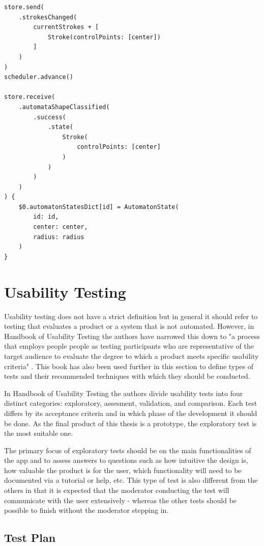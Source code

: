 \begin{lstlisting}[caption={Testing creation of state}, label=test-state]
store.send(
    .strokesChanged(
        currentStrokes + [
            Stroke(controlPoints: [center])
        ]
    )
)
scheduler.advance()

store.receive(
    .automataShapeClassified(
        .success(
            .state(
                Stroke(
                    controlPoints: [center]
                )
            )
        )
    )
) {
    $0.automatonStatesDict[id] = AutomatonState(
        id: id,
        center: center,
        radius: radius
    )
}
\end{lstlisting}

\section{Usability Testing}

Usability testing does not have a strict definition but in general it should refer to testing that evaluates a product or a system that is not automated. However, in Handbook of Usability Testing the authors have narrowed this down to "a process that employs people people as testing participants who are representative of the target audience to evaluate the degree to which a product meets specific usability criteria" \cite{handbook-usability-testing}. This book has also been used further in this section to define types of tests and their recommended techniques with which they should be conducted.

In Handbook of Usability Testing the authors divide usability tests into four distinct categories: exploratory, assesment, validation, and comparison. Each test differs by its acceptance criteria and in which phase of the development it should be done. As the final product of this thesis is a prototype, the exploratory test is the most suitable one.

The primary focus of exploratory tests should be on the main functionalities of the app and to assess answers to questions such as how intuitive the design is, how valuable the product is for the user, which functionality will need to be documented via a tutorial or help, etc. This type of test is also different from the others in that it is expected that the moderator conducting the test will communicate with the user extensively - whereas the other tests should be possible to finish without the moderator stepping in.

\subsection{Test Plan}

